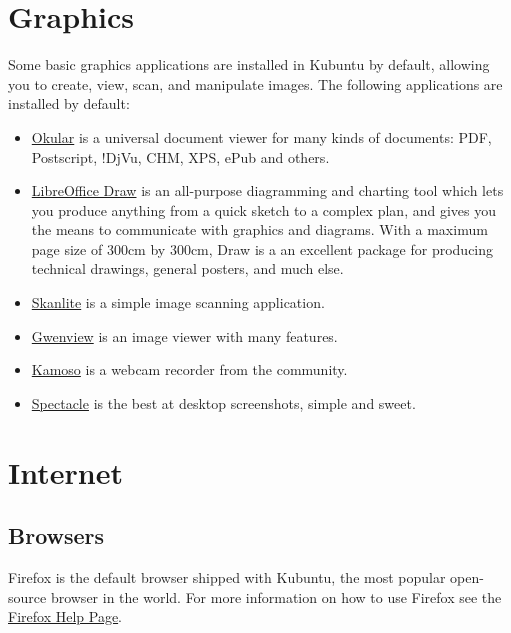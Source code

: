 \documentclass[letterpaper,10pt,english]{sphinxmanual}
\begin{document}
\section{Graphics}
\label{\detokenize{docs/software:graphics}}
Some basic graphics applications are installed in Kubuntu by default, allowing you to create, view, scan, and manipulate images. The following applications are installed by default:
\begin{itemize}
\item {} 
\href{https://userbase.kde.org/Special:MyLanguage/Okular}{Okular} is a universal document viewer for many kinds of documents: PDF, Postscript, !DjVu, CHM, XPS, ePub and others.

\item {} 
\href{http://www.libreoffice.org/discover/draw/}{LibreOffice Draw} is an all-purpose diagramming and charting tool which lets you produce anything from a quick sketch to a complex plan, and gives you the means to communicate with graphics and diagrams. With a maximum page size of 300cm by 300cm, Draw is a an excellent package for producing technical drawings, general posters, and much else.

\item {} 
\href{https://userbase.kde.org/Special:MyLanguage/Skanlite}{Skanlite} is a simple image scanning application.

\item {} 
\href{https://userbase.kde.org/Special:MyLanguage/Gwenview}{Gwenview} is an image viewer with many features.

\item {} 
\href{https://userbase.kde.org/Special:MyLanguage/Kamoso}{Kamoso} is a webcam recorder from the  community.

\item {} 
\href{https://www.kde.org/applications/graphics/spectacle/}{Spectacle} is the best at desktop screenshots, simple and sweet.

\end{itemize}


\section{Internet}
\label{\detokenize{docs/software:internet}}

\subsection{Browsers}
\label{\detokenize{docs/software:browsers}}
Firefox is the default browser shipped with Kubuntu, the most popular open-source browser in the world. For more information on how to use Firefox see the \href{https://support.mozilla.org/en-US/products/firefox}{Firefox Help Page}.
\end{document}
